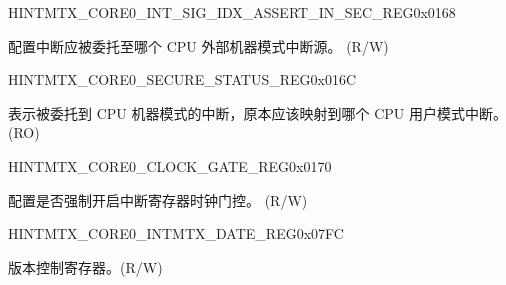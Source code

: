 \begin{register}{H}{INTMTX\_CORE0\_INT\_SIG\_IDX\_ASSERT\_IN\_SEC\_REG}{0x0168}\label{regdesc:INTMTXCORE0INTSIGIDXASSERTINSECREG}
%
%
\regnewline%
\begin{regdesc}\begin{reglist}
\label{fielddesc:INTMTXCORE0INTSIGIDXASSERTINSEC}\item [INTMTX\_CORE0\_INT\_SIG\_IDX\_ASSERT\_IN\_SEC] 配置中断应被委托至哪个 CPU 外部机器模式中断源。 (R/W)
\end{reglist}\end{regdesc}
\end{register}


\begin{register}{H}{INTMTX\_CORE0\_SECURE\_STATUS\_REG}{0x016C}\label{regdesc:INTMTXCORE0SECURESTATUSREG}
%
\regnewline%
\begin{regdesc}\begin{reglist}
\label{fielddesc:INTMTXCORE0INTSECURESTATUS}\item [INTMTX\_CORE0\_INT\_SECURE\_STATUS] 表示被委托到 CPU 机器模式的中断，原本应该映射到哪个 CPU 用户模式中断。 (RO)
\end{reglist}\end{regdesc}
\end{register}



\begin{register}{H}{INTMTX\_CORE0\_CLOCK\_GATE\_REG}{0x0170}\label{regdesc:INTMTXCORE0CLOCKGATEREG}
%
%
\regnewline%
\begin{regdesc}\begin{reglist}
\label{fielddesc:INTMTXCORE0REGCLKEN}\item [INTMTX\_CORE0\_REG\_CLK\_EN] 配置是否强制开启中断寄存器时钟门控。 (R/W)
\end{reglist}\end{regdesc}
\end{register}


\begin{register}{H}{INTMTX\_CORE0\_INTMTX\_DATE\_REG}{0x07FC}\label{regdesc:INTMTXCORE0INTMTXDATEREG}
%
%
\regnewline%
\begin{regdesc}\begin{reglist}
\label{fielddesc:INTMTXCORE0INTMTXDATE}\item [INTMTX\_CORE0\_INTMTX\_DATE] 版本控制寄存器。(R/W)
\end{reglist}\end{regdesc}
\end{register}


